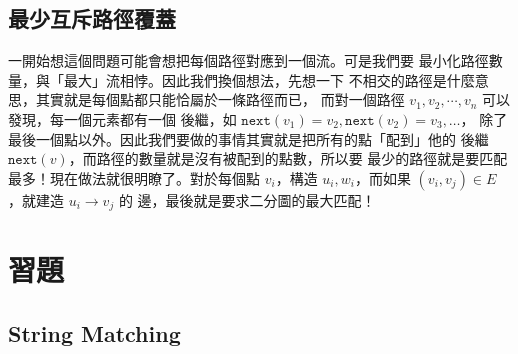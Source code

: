 \documentclass[a4paper,12pt]{book}
\begin{document}
\subsection{最少互斥路徑覆蓋}

一開始想這個問題可能會想把每個路徑對應到一個流。可是我們要
最小化路徑數量，與「最大」流相悖。因此我們換個想法，先想一下
不相交的路徑是什麼意思，其實就是每個點都只能恰屬於一條路徑而已，
而對一個路徑 $v_1, v_2, \cdots, v_n$ 可以發現，每一個元素都有一個
後繼，如 $\mathtt{next}(v_1) = v_2, \mathtt{next}(v_2) = v_3, \dots$，
除了最後一個點以外。因此我們要做的事情其實就是把所有的點「配到」他的
後繼 $\mathtt{next}(v)$，而路徑的數量就是沒有被配到的點數，所以要
最少的路徑就是要匹配最多！現在做法就很明瞭了。對於每個點 $v_i$，構造
$u_i, w_i$，而如果 $(v_i, v_j) \in E$ ，就建造 $u_i \rightarrow v_j$ 的
邊，最後就是要求二分圖的最大匹配！


\section{習題}

    
  \subsection{String Matching}


\end{document}
